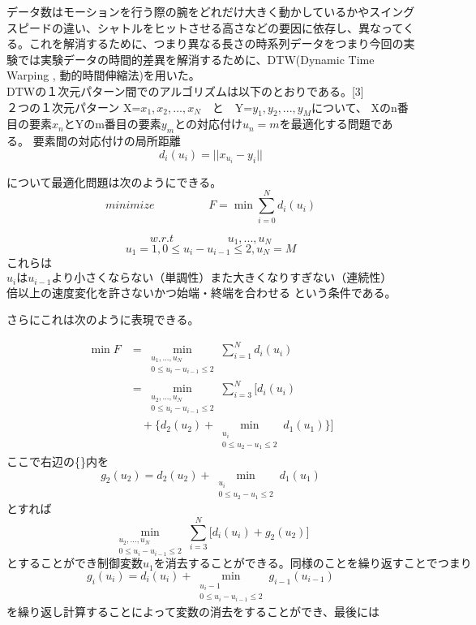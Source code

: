 \documentclass[11pt,a4j,notitlepage]{jreport}
\begin{document}
データ数はモーションを行う際の腕をどれだけ大きく動かしているかやスイングスピードの違い、シャトルをヒットさせる高さなどの要因に依存し、異なってくる。これを解消するために、つまり異なる長さの時系列データをつまり今回の実験では実験データの時間的差異を解消するために、DTW(Dynamic Time Warping , 動的時間伸縮法)を用いた。\\
DTWの１次元パターン間でのアルゴリズムは以下のとおりである。[3]\\

２つの１次元パターン X=$x_1, x_2,...,x_N$　と　Y=$y_1,y_2,...,y_M$について、
Xのn番目の要素$x_n$とYのm番目の要素$y_m$との対応付け$u_n=m$を最適化する問題である。
要素間の対応付けの局所距離
\[
d_i(u_i)=||x_{u_i}-y_i||
\]

について最適化問題は次のようにできる。
\[
minimize\hspace{2cm}F = \min \sum_{i=0}^N d_i(u_i)
\]

\[
w.r.t\hspace{2cm}u_1,...,u_N
\]
\[
u_1 = 1 , 0 \leq u_i - u _{i-1} \leq 2 , u_N = M
\]
これらは
$u_iはu_{i-1}より小さくならない（単調性）また大きくなりすぎない（連続性）$
$倍以上の速度変化を許さないかつ始端・終端を合わせる$
という条件である。

さらにこれは次のように表現できる。

\[
\begin{split}
\min F&= \min_{\substack{u_1,...,u_N  \\ 0\leq u_i-u_{i-1} \leq 2}} \sum_{i=1}^N d_i (u_i)\\
     &=\min_{\substack{u_2,...,u_N  \\ 0\leq u_i-u_{i-1} \leq 2}}\sum_{i=3}^N \biggl[ d_i (u_i) \\
     &\quad +\{ d_2(u_2)+\min_{\substack{u_i \\0\leq u_2 - u_1 \leq 2}}d_1(u_1) \} \biggr]
\end{split}
\]
ここで右辺の\{\}内を
\[
g_2(u_2)=d_2(u_2)+\min_{\substack{u_i \\0\leq u_2 - u_1 \leq 2}}d_1(u_1)
\]
とすれば
\[
\min_{\substack{u_2,...,u_N  \\ 0\leq u_i-u_{i-1} \leq 2}}\sum_{i=3}^N \biggl[  d_i (u_i)+g_2(u_2) \biggr]
\]
$とすることができ制御変数u_1を消去することができる。同様のことを繰り返すことでつまり$
\begin{equation}
g_i(u_i)=d_i(u_i)+\min_{\substack{u_i-1\\0\leq u_i-u_{i-1} \leq 2}}g_{i-1}(u_{i-1})
\end{equation}
を繰り返し計算することによって変数の消去をすることができ、最後には
\end{document}

